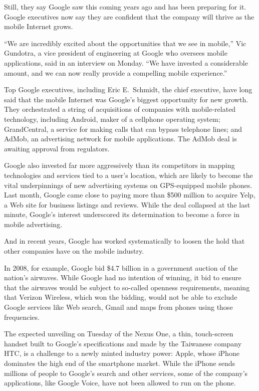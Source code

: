 ﻿\documentclass[12pt]{article}
\begin{document}
Still, they say Google saw this coming years ago and has been preparing for it. Google executives
now say they are confident that the company will thrive as the mobile Internet grows.

``We are incredibly excited about the opportunities that we see in mobile,'' Vic Gundotra, a vice
president of engineering at Google who oversees mobile applications, said in an interview on Monday.
``We have invested a considerable amount, and we can now really provide a compelling mobile
experience.''

Top Google executives, including Eric E.~Schmidt, the chief executive, have long said that the
mobile Internet was Google's biggest opportunity for new growth. They orchestrated a string of
acquisitions of companies with mobile-related technology, including Android, maker of a cellphone
operating system; GrandCentral, a service for making calls that can bypass telephone lines; and
AdMob, an advertising network for mobile applications. The AdMob deal is awaiting approval from
regulators.

Google also invested far more aggressively than its competitors in mapping technologies and services
tied to a user's location, which are likely to become the vital underpinnings of new advertising
systems on GPS-equipped mobile phones. Last month, Google came close to paying more than \$500
million to acquire Yelp, a Web site for business listings and reviews. While the deal collapsed at
the last minute, Google's interest underscored its determination to become a force in mobile
advertising.

And in recent years, Google has worked systematically to loosen the hold that other companies have
on the mobile industry.

In 2008, for example, Google bid \$4.7 billion in a government auction of the nation's airwaves.
While Google had no intention of winning, it bid to ensure that the airwaves would be subject to
so-called openness requirements, meaning that Verizon Wireless, which won the bidding, would not be
able to exclude Google services like Web search, Gmail and maps from phones using those frequencies.

The expected unveiling on Tuesday of the Nexus One, a thin, touch-screen handset built to Google's
specifications and made by the Taiwanese company HTC, is a challenge to a newly minted industry
power: Apple, whose iPhone dominates the high end of the smartphone market. While the iPhone sends
millions of people to Google's search and other services, some of the company's applications, like
Google Voice, have not been allowed to run on the phone.
\end{document}
